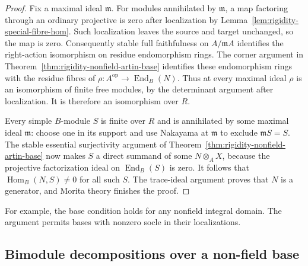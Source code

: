 \documentclass[12pt,a4paper,english,reqno]{amsart}
\numberwithin{equation}{section}
\theoremstyle{plain}
\theoremstyle{definition}
\begin{document}
\begin{proof}
Fix a maximal ideal $\mathfrak m$. For modules annihilated by
$\mathfrak m$, a map factoring through an ordinary projective
is zero after localization by
Lemma~\ref{lem:rigidity-special-fibre-hom}. Such localization
leaves the source and target unchanged, so the map is zero.
Consequently stable full faithfulness on $A/\mathfrak m A$
identifies the right-action isomorphism on residue endomorphism
rings. The corner argument in
Theorem~\ref{thm:rigidity-nonfield-artin-base} identifies these
endomorphism rings with the residue fibres of
$\rho:A^{\mathrm{op}}\to\operatorname{End}_B(N)$.
Thus at every maximal ideal $\rho$ is an isomorphism of finite
free modules, by the determinant argument after localization.
It is therefore an isomorphism over $R$.

Every simple $B$-module $S$ is finite over $R$ and is annihilated
by some maximal ideal $\mathfrak m$: choose one in its support
and use Nakayama at $\mathfrak m$ to exclude $\mathfrak m S=S$.
The stable essential surjectivity argument of
Theorem~\ref{thm:rigidity-nonfield-artin-base} now makes $S$
a direct summand of some $N\otimes_A X$, because the projective
factorization ideal on $\operatorname{End}_B(S)$ is zero.
It follows that $\operatorname{Hom}_B(N,S)\ne0$ for all such $S$.
The trace-ideal argument proves that $N$ is a generator,
and Morita theory finishes the proof.
\end{proof}

For example, the base condition holds for any nonfield
integral domain. The argument permits bases with nonzero socle
in their localizations.

\subsection{Bimodule decompositions over a non-field base}
\end{document}
